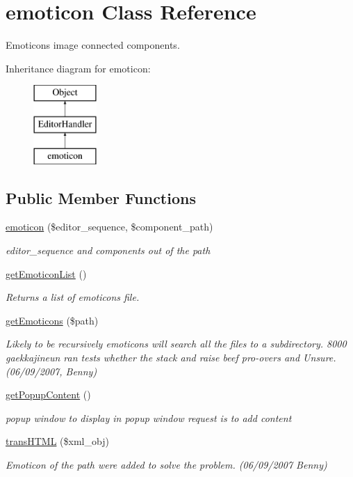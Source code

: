 \hypertarget{classemoticon}{\section{emoticon Class Reference}
\label{classemoticon}
}


Emoticons image connected components.  


Inheritance diagram for emoticon\+:\begin{figure}[H]
\begin{center}
\leavevmode
\includegraphics[height=3.000000cm]{classemoticon}
\end{center}
\end{figure}
\subsection*{Public Member Functions}
\begin{DoxyCompactItemize}
\item 
\hyperlink{classemoticon_a8b042772a4d61cfcbdecbe945102a997}{emoticon} (\$editor\+\_\+sequence, \$component\+\_\+path)
\begin{DoxyCompactList}\small\item\em editor\+\_\+sequence and components out of the path \end{DoxyCompactList}\item 
\hyperlink{classemoticon_ac8b67c22af9daf48fb1d95f4fea2d07e}{get\+Emoticon\+List} ()
\begin{DoxyCompactList}\small\item\em Returns a list of emoticons file. \end{DoxyCompactList}\item 
\hyperlink{classemoticon_a95bdb6fcf406fc9882332a3b5f01542c}{get\+Emoticons} (\$path)
\begin{DoxyCompactList}\small\item\em Likely to be recursively emoticons will search all the files to a subdirectory. 8000 gaekkajineun ran tests whether the stack and raise beef pro-\/overs and Unsure. (06/09/2007, Benny) \end{DoxyCompactList}\item 
\hyperlink{classemoticon_afe901b31a28bed049ed8d553e996736d}{get\+Popup\+Content} ()
\begin{DoxyCompactList}\small\item\em popup window to display in popup window request is to add content \end{DoxyCompactList}\item 
\hyperlink{classemoticon_ae88c968e3b183a101c96d8013b4bf926}{trans\+H\+T\+M\+L} (\$xml\+\_\+obj)
\begin{DoxyCompactList}\small\item\em Emoticon of the path were added to solve the problem. (06/09/2007 Benny) \end{DoxyCompactList}\end{DoxyCompactItemize}
